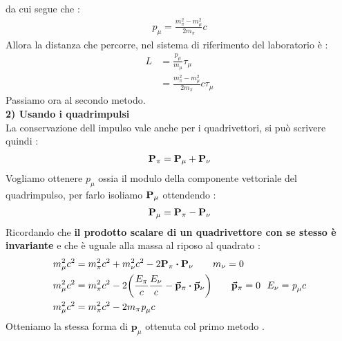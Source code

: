 da cui segue che : 
\begin{align*}
        \textit{p}_{\mu} = \frac{m_{\pi}^2 - m_{\mu}^2}{2m_{\pi}}c
\end{align*}
Allora la distanza che percorre, nel sistema di riferimento del laboratorio è : 
\begin{align*}
        L &= \frac{\textit{p}_{\mu}}{m_{\mu}}\tau_{\mu}\\
          &= \frac{m_{\pi}^2 - m_{\mu}^2}{2m_{\pi}}c\tau_{\mu}
\end{align*}
Passiamo ora al secondo metodo. \\
\textbf{2) Usando i quadrimpulsi}\\
La conservazione dell impulso vale anche per i quadrivettori, si può scrivere quindi : 
\begin{align*}
    \vb{P}_{\pi} = \vb{P}_{\mu} + \vb{P}_{\nu}
\end{align*}
Vogliamo ottenere $\textit{p}_{\mu}$ ossia il modulo della componente vettoriale del quadrimpulso, per farlo 
isoliamo $\vb{P}_{\mu}$ ottendendo : 
\begin{align*}
    \vb{P}_{\mu} = \vb{P}_{\pi} - \vb{P}_{\nu}
\end{align*}
Ricordando che \textbf{il prodotto scalare di un quadrivettore con se stesso è invariante} e che è uguale alla massa al riposo 
al quadrato : 
\begin{align*}
        m_{\mu}^2c^2 &= m_{\pi}^2c^2 + m_{\nu}^2c^2 -2\vb{P}_{\pi}\vdot\vb{P}_{\nu}  \tag*{$m_{\nu} = 0$} \\
        m_{\mu}^2c^2 &= m_{\pi}^2c^2 -2\qty(\frac{E_{\pi}}{c} \frac{E_{\nu}}{c} - \va{p}_{\pi}\vdot\va{p}_{\nu}) \tag*{$\va{p}_{\pi} = 0$ \ $E_{\nu} = \textit{p}_{\mu}c$}\\
        m_{\mu}^2c^2 &= m_{\pi}^2c^2 -2m_{\pi}\textit{p}_{\mu}c 
\end{align*}
Otteniamo la stessa forma di $\textbf{p}_{\mu}$ ottenuta col primo metodo . 
\newpage

